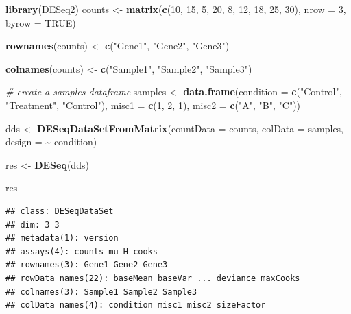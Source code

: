 \documentclass[
]{book}
\newenvironment{Shaded}{\begin{snugshade}}{\end{snugshade}}
\newcommand{\AttributeTok}[1]{\textcolor[rgb]{0.13,0.29,0.53}{#1}}
\newcommand{\CommentTok}[1]{\textcolor[rgb]{0.56,0.35,0.01}{\textit{#1}}}
\newcommand{\ConstantTok}[1]{\textcolor[rgb]{0.56,0.35,0.01}{#1}}
\newcommand{\DecValTok}[1]{\textcolor[rgb]{0.00,0.00,0.81}{#1}}
\newcommand{\FunctionTok}[1]{\textcolor[rgb]{0.13,0.29,0.53}{\textbf{#1}}}
\newcommand{\NormalTok}[1]{#1}
\newcommand{\OtherTok}[1]{\textcolor[rgb]{0.56,0.35,0.01}{#1}}
\newcommand{\SpecialCharTok}[1]{\textcolor[rgb]{0.81,0.36,0.00}{\textbf{#1}}}
\newcommand{\StringTok}[1]{\textcolor[rgb]{0.31,0.60,0.02}{#1}}
\begin{document}
\begin{Shaded}
\begin{Highlighting}[]
\FunctionTok{library}\NormalTok{(DESeq2)}
\NormalTok{counts }\OtherTok{\textless{}{-}} \FunctionTok{matrix}\NormalTok{(}\FunctionTok{c}\NormalTok{(}\DecValTok{10}\NormalTok{, }\DecValTok{15}\NormalTok{, }\DecValTok{5}\NormalTok{, }\DecValTok{20}\NormalTok{, }\DecValTok{8}\NormalTok{, }\DecValTok{12}\NormalTok{, }\DecValTok{18}\NormalTok{, }\DecValTok{25}\NormalTok{, }\DecValTok{30}\NormalTok{), }\AttributeTok{nrow =} \DecValTok{3}\NormalTok{, }\AttributeTok{byrow =} \ConstantTok{TRUE}\NormalTok{)}

\FunctionTok{rownames}\NormalTok{(counts) }\OtherTok{\textless{}{-}} \FunctionTok{c}\NormalTok{(}\StringTok{"Gene1"}\NormalTok{, }\StringTok{"Gene2"}\NormalTok{, }\StringTok{"Gene3"}\NormalTok{)}

\FunctionTok{colnames}\NormalTok{(counts) }\OtherTok{\textless{}{-}} \FunctionTok{c}\NormalTok{(}\StringTok{"Sample1"}\NormalTok{, }\StringTok{"Sample2"}\NormalTok{, }\StringTok{"Sample3"}\NormalTok{)}

\CommentTok{\# create a \textquotesingle{}samples\textquotesingle{} dataframe}
\NormalTok{samples }\OtherTok{\textless{}{-}} \FunctionTok{data.frame}\NormalTok{(}\AttributeTok{condition =} \FunctionTok{c}\NormalTok{(}\StringTok{"Control"}\NormalTok{, }\StringTok{"Treatment"}\NormalTok{, }\StringTok{"Control"}\NormalTok{), }
              \AttributeTok{misc1 =} \FunctionTok{c}\NormalTok{(}\DecValTok{1}\NormalTok{, }\DecValTok{2}\NormalTok{, }\DecValTok{1}\NormalTok{),}
              \AttributeTok{misc2 =} \FunctionTok{c}\NormalTok{(}\StringTok{"A"}\NormalTok{, }\StringTok{"B"}\NormalTok{, }\StringTok{"C"}\NormalTok{))}

\NormalTok{dds }\OtherTok{\textless{}{-}} \FunctionTok{DESeqDataSetFromMatrix}\NormalTok{(}\AttributeTok{countData =}\NormalTok{ counts, }
                              \AttributeTok{colData =}\NormalTok{ samples, }
                              \AttributeTok{design =} \SpecialCharTok{\textasciitilde{}}\NormalTok{ condition) }

\NormalTok{res }\OtherTok{\textless{}{-}} \FunctionTok{DESeq}\NormalTok{(dds)}

\NormalTok{res}
\end{Highlighting}
\end{Shaded}

\begin{verbatim}
## class: DESeqDataSet 
## dim: 3 3 
## metadata(1): version
## assays(4): counts mu H cooks
## rownames(3): Gene1 Gene2 Gene3
## rowData names(22): baseMean baseVar ... deviance maxCooks
## colnames(3): Sample1 Sample2 Sample3
## colData names(4): condition misc1 misc2 sizeFactor
\end{verbatim}
\end{document}
